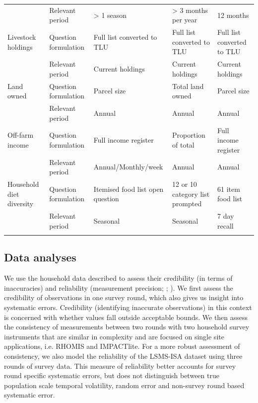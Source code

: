 \begin{table}
\begin{tabular}{L{1.8cm} L{2cm} L{3.33cm} L{3.33cm} L{3.33cm}}
 & Relevant period & {\textgreater} 1 season & {\textgreater} 3 months per year & 12 months \\
 \midrule
Livestock holdings & Question formulation & Full list converted to TLU & Full list converted to TLU & Full list converted to TLU \\
 & Relevant period & Current holdings & Current holdings & Current holdings \\
 \midrule
Land owned & Question formulation & Parcel size & Total land owned & Parcel size \\
 & Relevant period & Annual & Annual & Annual \\
 \midrule
Off-farm income & Question formulation & Full income register & Proportion of total & Full income register \\
 & Relevant period & Annual/Monthly/week & Annual & Annual \\
 \midrule
Household diet diversity & Question formulation & Itemised food list open question & 12 or 10 category list prompted & 61 item food list \\
 & Relevant period & Seasonal & Seasonal & 7 day recall \\
\bottomrule
\end{tabular}
\end{table}

\subsection{Data analyses}

We use the household data described to assess their credibility (in terms of inaccuracies) and reliability (measurement precision; \citealp{Alwin2006}; \citealp{Evans1995}). We first assess the credibility of observations in one survey round, which also gives us insight into systematic errors. Credibility (identifying inaccurate observations) in this context is concerned with whether values fall outside acceptable bounds. We then assess the consistency of measurements between two rounds with two household survey instruments that are similar in complexity and are focused on single site applications, i.e. RHOMIS and IMPACTlite. For a more robust assessment of consistency, we also model the reliability of the LSMS-ISA dataset using three rounds of survey data. This measure of reliability better accounts for survey round specific systematic errors, but does not distinguish between true population scale temporal volatility, random error and non-survey round based systematic error.

